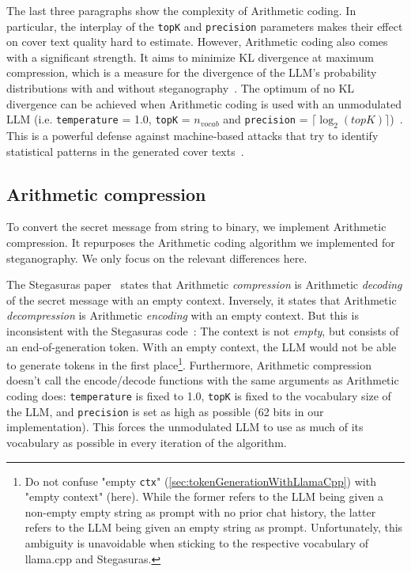 The last three paragraphs show the complexity of Arithmetic coding. In particular, the interplay of the \lstinline|topK| and \lstinline|precision| parameters makes their effect on cover text quality hard to estimate. However, Arithmetic coding also comes with a significant strength. It aims to minimize \gls{KL} divergence at maximum compression, which is a measure for the divergence of the \gls{LLM}'s probability distributions with and without steganography~\cite{zieglerNeuralLinguisticSteganography2019}. The optimum of no \gls{KL} divergence can be achieved when Arithmetic coding is used with an unmodulated \gls{LLM} (i.e. \lstinline|temperature| = 1.0, \lstinline|topK| = $n_{vocab}$ and \lstinline|precision| = $ \lceil \log_2(topK) \rceil $)~\cite{zieglerNeuralLinguisticSteganography2019}. This is a powerful defense against machine-based attacks that try to identify statistical patterns in the generated cover texts~\cite{zieglerNeuralLinguisticSteganography2019}.

\subsection{Arithmetic compression}
\label{sec:arithmeticCompression}
To convert the secret message from string to binary, we implement Arithmetic compression. It repurposes the Arithmetic coding algorithm we implemented for steganography. We only focus on the relevant differences here.

The Stegasuras paper~\cite{zieglerNeuralLinguisticSteganography2019} states that Arithmetic \textit{compression} is Arithmetic \textit{decoding} of the secret message with an empty context. Inversely, it states that Arithmetic \textit{decompression} is Arithmetic \textit{encoding} with an empty context. But this is inconsistent with the Stegasuras code~\cite{zieglerHarvardnlpNeuralSteganography2025}: The context is not \textit{empty}, but consists of an end-of-generation token. With an empty context, the \gls{LLM} would not be able to generate tokens in the first place\footnote{Do not confuse "empty \lstinline|ctx|" (\cref{sec:tokenGenerationWithLlamaCpp}) with "empty context" (here). While the former refers to the \gls{LLM} being given a non-empty empty string as prompt with no prior chat history, the latter refers to the \gls{LLM} being given an empty string as prompt. Unfortunately, this ambiguity is unavoidable when sticking to the respective vocabulary of llama.cpp and Stegasuras.}. Furthermore, Arithmetic compression doesn't call the encode/decode functions with the same arguments as Arithmetic coding does: \lstinline|temperature| is fixed to 1.0, \lstinline|topK| is fixed to the vocabulary size of the \gls{LLM}, and \lstinline|precision| is set as high as possible (62 bits in our implementation). This forces the unmodulated \gls{LLM} to use as much of its vocabulary as possible in every iteration of the algorithm.

